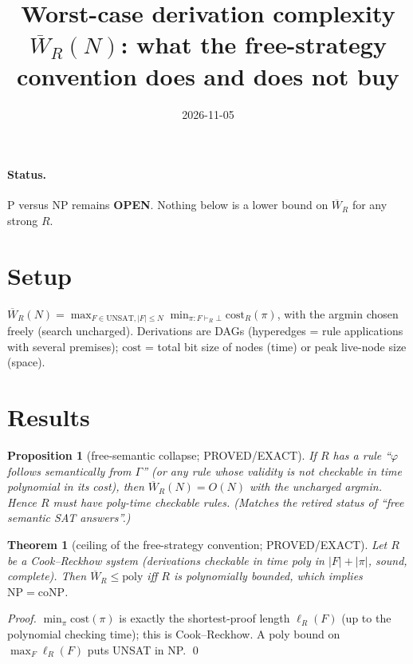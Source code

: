 \documentclass{article}
\title{Worst-case derivation complexity $\overline W_R(N)$: what the free-strategy convention does and does not buy}
\date{2026-11-05}
\newtheorem{thm}{Theorem}\newtheorem{prop}{Proposition}
\begin{document}
\maketitle
\paragraph{Status.} P versus NP remains \textbf{OPEN}. Nothing below is a lower bound on $\overline W_R$ for any strong $R$.
\section*{Setup}
$\overline W_R(N)=\max_{F\in\mathrm{UNSAT},|F|\le N}\min_{\pi:F\vdash_R\bot}\mathrm{cost}_R(\pi)$, with the argmin chosen freely (search uncharged).
Derivations are DAGs (hyperedges = rule applications with several premises); $\mathrm{cost}$ = total bit size of nodes (time) or peak live-node size (space).
\section*{Results}
\begin{prop}[free-semantic collapse; PROVED/EXACT]\label{p1}
If $R$ has a rule ``$\varphi$ follows semantically from $\Gamma$'' (or any rule whose validity is not checkable in time polynomial in its cost), then $\overline W_R(N)=O(N)$ with the uncharged argmin. Hence $R$ must have poly-time checkable rules. (Matches the retired status of ``free semantic SAT answers''.)
\end{prop}
\begin{thm}[ceiling of the free-strategy convention; PROVED/EXACT]\label{t1}
Let $R$ be a Cook--Reckhow system (derivations checkable in time poly in $|F|+|\pi|$, sound, complete). Then $\overline W_R\le \mathrm{poly}$ iff $R$ is polynomially bounded, which implies $\mathrm{NP}=\mathrm{coNP}$.
\end{thm}
\emph{Proof.} $\min_\pi\mathrm{cost}(\pi)$ is exactly the shortest-proof length $\ell_R(F)$ (up to the polynomial checking time); this is Cook--Reckhow. A poly bound on $\max_F\ell_R(F)$ puts UNSAT in NP. \qed
\end{document}
